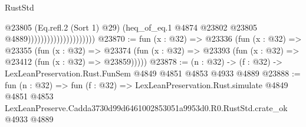 \begin{lexlean}{RustStd}
\begin{coremodule}
                                            @23805
                                            (Eq.refl.{2} (Sort 1) @29)
                                            (heq_of_eq.{1}
                                              @4874
                                              @23802
                                              @23805
                                              @4889)))))))))))))))))))))
@23870 := fun (x : @32) =>
  @23336
    (fun (x : @32) =>
    @23355
      (fun (x : @32) =>
      @23374 (fun (x : @32) => @23393 (fun (x : @32) => @23412 (fun (x : @32) => @23859)))))
@23878 := (n : @32) -> (f : @32) -> LexLeanPreservation.Rust.FunSem @4849 @4851 @4853 @4933 @4889
@23888 := fun (n : @32) =>
  fun (f : @32) =>
  LexLeanPreservation.Rust.simulate
    @4849
    @4851
    @4853
    LexLeanPreserve.Cadda3730d99d6461002853051a9953d0.R0.RustStd.crate_ok
    @4933
    @4889
\end{coremodule}
\end{lexlean}

